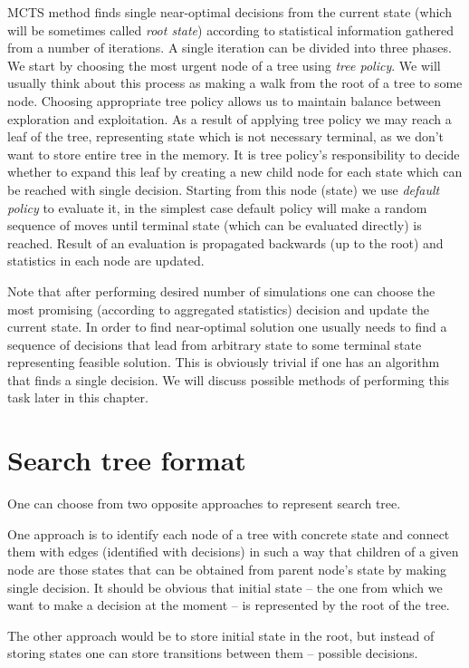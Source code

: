 MCTS method finds single near-optimal decisions from the current state (which
will be sometimes called \emph{root state}) according to statistical
information gathered from a number of iterations. A single iteration can be
divided into three phases.
We start by choosing the most urgent node of a tree using \emph{tree policy}.
We will usually think about this process as making a walk from the root of a
tree to some node. Choosing appropriate tree policy allows us to maintain
balance between exploration and exploitation.
As a result of applying tree policy we may reach a leaf of the tree,
representing state which is not necessary terminal, as we don't want to store
entire tree in the memory. It is tree policy's responsibility to decide whether
to expand this leaf by creating a new child node for each state which can be
reached with single decision.
Starting from this node (state) we use \emph{default policy} to evaluate it, in
the simplest case default policy will make a random sequence of moves until
terminal state (which can be evaluated directly) is reached.
Result of an evaluation is propagated backwards (up to the root) and statistics
in each node are updated.

Note that after performing desired number of simulations one can choose the
most promising (according to aggregated statistics) decision and update the
current state. In order to find near-optimal solution one usually needs to find
a sequence of decisions that lead from arbitrary state to some terminal state
representing feasible solution. This is obviously trivial if one has an
algorithm that finds a single decision. We will discuss possible methods of
performing this task later in this chapter.

\section{Search tree format}
One can choose from two opposite approaches to represent search tree.

One approach is to identify each node of a tree with concrete state and connect
them with edges (identified with decisions) in such a way that children of a
given node are those states that can be obtained from parent node's state by
making single decision. It should be obvious that initial state -- the one from
which we want to make a decision at the moment -- is represented by the root of
the tree.

The other approach would be to store initial state in the root, but instead of
storing states one can store transitions between them -- possible decisions.

